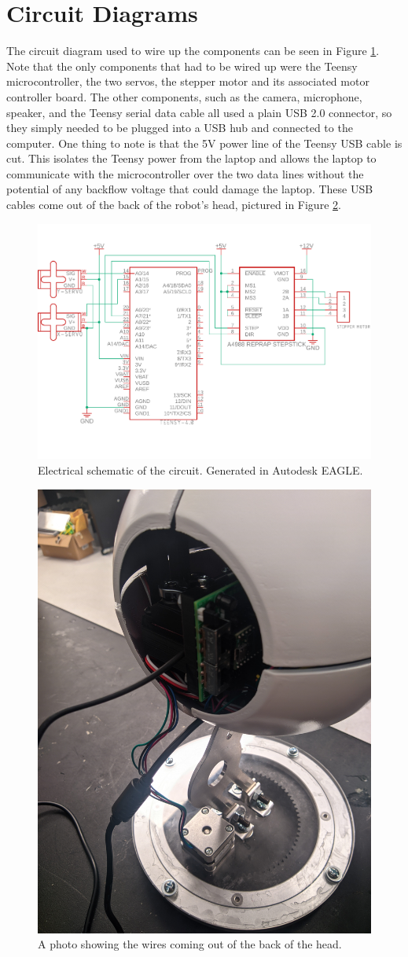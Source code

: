 \section{Circuit Diagrams}
The circuit diagram used to wire up the components can be seen in Figure \ref{fig:circuit_diagram}. Note that the only components that had to be wired up were the Teensy microcontroller, the two servos, the stepper motor and its associated motor controller board. The other components, such as the camera, microphone, speaker, and the Teensy serial data cable all used a plain USB 2.0 connector, so they simply needed to be plugged into a USB hub and connected to the computer. One thing to note is that the 5V power line of the Teensy USB cable is cut. This isolates the Teensy power from the laptop and allows the laptop to communicate with the microcontroller over the two data lines without the potential of any backflow voltage that could damage the laptop. These USB cables come out of the back of the robot's head, pictured in Figure \ref{fig:back-wires}.

\begin{figure}[h]
    \centering
    \includegraphics[width=0.8\linewidth]{Thesis/ch4/theses-schematic-2.pdf}
    \caption{Electrical schematic of the circuit. Generated in Autodesk EAGLE.}
    \label{fig:circuit_diagram}
\end{figure}

\begin{figure}[h]
    \centering
    \includegraphics[width=0.4\linewidth]{Thesis/ch4/back-wires.jpg}
    \caption{A photo showing the wires coming out of the back of the head.}
    \label{fig:back-wires}
\end{figure}
